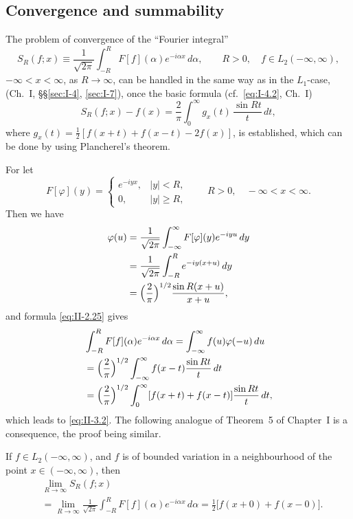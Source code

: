 \subsection*{Convergence and summability}
\noindent The problem of convergence of the ``Fourier integral''
\begin{equation}\tag{3.1}\label{eq:II-3.1}
S_{R}(f;x)\equiv \frac{1}{\sqrt{2\pi}}\int_{-R}^{R}F[f](\alpha)e^{-i\alpha x}\,d\alpha,\qquad R>0,\quad f\in L_{2}(-\infty,\infty),
\end{equation}
$-\infty<x<\infty$, as $R\to\infty$, can be handled in the same way as in the $L_{1}$-case, (Ch.~I, \S\S\ref{sec:I-4}, \ref{sec:I-7}), once the basic formula (cf.\ \eqref{eq:I-4.2}, Ch.~I)
\begin{equation}\tag{3.2}\label{eq:II-3.2}
S_{R}(f;x)-f(x)=\frac{2}{\pi}\int_{0}^{\infty}g_{x}(t)\,\frac{\sin Rt}{t}\,dt,
\end{equation}
where $g_{x}(t)=\frac{1}{2}[f(x+t)+f(x-t)-2f(x)]$, is established, which can be done by using Plancherel's theorem.

For let
\[
F[\varphi](y)=
\begin{cases}
e^{-iyx}, & |y|<R,\\
0, & |y|\ge R,
\end{cases}
\qquad R>0,\quad -\infty<x<\infty.
\]
Then we have
\[
\begin{aligned}
\varphi(u) &= \frac{1}{\sqrt{2\pi}}\int_{-\infty}^{\infty}F[\varphi](y)e^{-iyu}\,dy\\
&= \frac{1}{\sqrt{2\pi}}\int_{-R}^{R}e^{-iy(x+u)}\,dy\\
&= \Bigl(\frac{2}{\pi}\Bigr)^{1/2}\frac{\sin R(x+u)}{x+u},
\end{aligned}
\]
and formula \eqref{eq:II-2.25} gives
\[
\begin{aligned}
&\int_{-R}^{R}F[f](\alpha)e^{-i\alpha x}\,d\alpha = \int_{-\infty}^{\infty}f(u)\varphi(-u)\,du\\
&= \Bigl(\frac{2}{\pi}\Bigr)^{1/2}\int_{-\infty}^{\infty}f(x-t)\frac{\sin Rt}{t}\,dt\\
&= \Bigl(\frac{2}{\pi}\Bigr)^{1/2}\int_{0}^{\infty}[f(x+t)+f(x-t)]\frac{\sin Rt}{t}\,dt,
\end{aligned}
\]
which leads to \eqref{eq:II-3.2}. The following analogue of Theorem~5 of Chapter~I is a consequence, the proof being similar.

\begin{theorem}\label{thm:II-2}
If $f\in L_{2}(-\infty,\infty)$, and $f$ is of bounded variation in a neighbourhood of the point $x\in(-\infty,\infty)$, then
\[
\begin{aligned}
&\lim_{R\to\infty}S_{R}(f;x)\\
&= \lim_{R\to\infty}\frac{1}{\sqrt{2\pi}}  \int_{-R}^{R}F[f](\alpha)e^{-i\alpha x}\,d\alpha = \frac{1}{2}  \bigl[f(x+0)+f(x-0)\bigr].
\end{aligned}
\]
\end{theorem}

